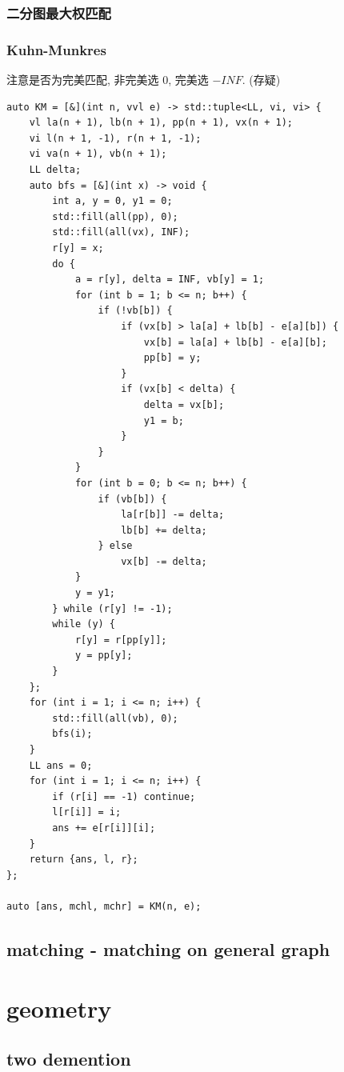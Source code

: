 \documentclass[UTF8, a4paper, titlepage, twoside]{ctexart}
\begin{document}
\subsubsection*{ 二分图最大权匹配 }
\subsubsection*{ Kuhn-Munkres }
注意是否为完美匹配, 非完美选 \(0\), 完美选 \(-INF\). (存疑)

\begin{lstlisting}[style=cpp]
auto KM = [&](int n, vvl e) -> std::tuple<LL, vi, vi> {
    vl la(n + 1), lb(n + 1), pp(n + 1), vx(n + 1);
    vi l(n + 1, -1), r(n + 1, -1);
    vi va(n + 1), vb(n + 1);
    LL delta;
    auto bfs = [&](int x) -> void {
        int a, y = 0, y1 = 0;
        std::fill(all(pp), 0);
        std::fill(all(vx), INF);
        r[y] = x;
        do {
            a = r[y], delta = INF, vb[y] = 1;
            for (int b = 1; b <= n; b++) {
                if (!vb[b]) {
                    if (vx[b] > la[a] + lb[b] - e[a][b]) {
                        vx[b] = la[a] + lb[b] - e[a][b];
                        pp[b] = y;
                    }
                    if (vx[b] < delta) {
                        delta = vx[b];
                        y1 = b;
                    }
                }
            }
            for (int b = 0; b <= n; b++) {
                if (vb[b]) {
                    la[r[b]] -= delta;
                    lb[b] += delta;
                } else
                    vx[b] -= delta;
            }
            y = y1;
        } while (r[y] != -1);
        while (y) {
            r[y] = r[pp[y]];
            y = pp[y];
        }
    };
    for (int i = 1; i <= n; i++) {
        std::fill(all(vb), 0);
        bfs(i);
    }
    LL ans = 0;
    for (int i = 1; i <= n; i++) {
        if (r[i] == -1) continue;
        l[r[i]] = i;
        ans += e[r[i]][i];
    }
    return {ans, l, r};
};

auto [ans, mchl, mchr] = KM(n, e);
\end{lstlisting}

\subsection{ matching - matching on general graph }

\newpage
\section{ geometry }
\subsection{ two demention }
\end{document}
